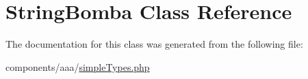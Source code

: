 \hypertarget{class_string_bomba}{
\section{StringBomba Class Reference}
\label{class_string_bomba}
}


The documentation for this class was generated from the following file:\begin{CompactItemize}
\item 
components/aaa/\hyperlink{simple_types_8php}{simpleTypes.php}\end{CompactItemize}
